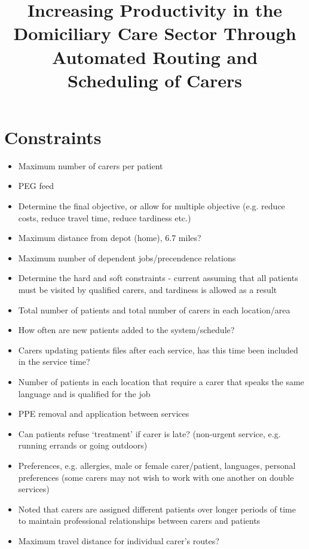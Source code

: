 \documentclass[a4paper]{article}
\begin{document}
\title{Increasing Productivity in the Domiciliary Care Sector Through Automated Routing and Scheduling of Carers}
\date{}
\maketitle

\section{Constraints}
\begin{itemize}[label=\textcolor{myRed}{\textbullet},leftmargin=*, itemsep=-0.1em]
	\item Maximum number of carers per patient
	\item PEG feed
	\item Determine the final objective, or allow for multiple objective (e.g. reduce costs, reduce travel time, reduce tardiness etc.)
	\item Maximum distance from depot (home), 6.7 miles?
	\item Maximum number of dependent jobs/precendence relations
	\item Determine the hard and soft constraints - current assuming that all patients must be visited by qualified carers, and tardiness is allowed as a result
	\item Total number of patients and total number of carers in each location/area
	\item How often are new patients added to the system/schedule?
	\item Carers updating patients files after each service, has this time been included in the service time?
	\item Number of patients in each location that require a carer that speaks the same language and is qualified for the job
	\item PPE removal and application between services
	\item Can patients refuse `treatment' if carer is late? (non-urgent service, e.g. running errands or going outdoors)
	\item Preferences, e.g. allergies, male or female carer/patient, languages, personal preferences (some carers may not wish to work with one another on double services) 
	\item Noted that carers are assigned different patients over longer periods of time to maintain professional relationships between carers and patients
	\item Maximum travel distance for individual carer's routes?

\end{itemize}
\end{document}
